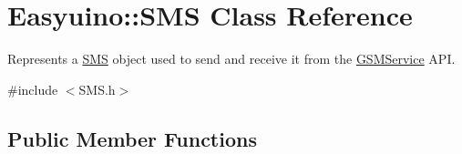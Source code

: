 \hypertarget{class_easyuino_1_1_s_m_s}{}\section{Easyuino\+:\+:S\+MS Class Reference}
\label{class_easyuino_1_1_s_m_s}


Represents a \hyperlink{class_easyuino_1_1_s_m_s}{S\+MS} object used to send and receive it from the \hyperlink{class_easyuino_1_1_g_s_m_service}{G\+S\+M\+Service} A\+PI.  




{\ttfamily \#include $<$S\+M\+S.\+h$>$}

\subsection*{Public Member Functions}
